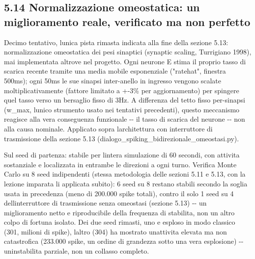 \documentclass[
  italian,
]{article}
\begin{document}
\subsection{5.14 Normalizzazione omeostatica: un miglioramento reale, verificato ma non perfetto}\label{normalizzazione-omeostatica-un-miglioramento-reale-verificato-ma-non-perfetto}

Decimo tentativo, l\textquotesingle unica pista rimasta indicata alla fine della sezione 5.13: normalizzazione omeostatica dei pesi sinaptici (synaptic scaling, Turrigiano 1998), mai implementata altrove nel progetto. Ogni neurone E stima il proprio tasso di scarica recente tramite una media mobile esponenziale ("ratehat", finestra 500ms); ogni 50ms le sue sinapsi inter-anello in ingresso vengono scalate moltiplicativamente (fattore limitato a +-3\% per aggiornamento) per spingere quel tasso verso un bersaglio fisso di 3Hz. A differenza del tetto fisso per-sinapsi (w\_\allowbreak{}max, l\textquotesingle unico strumento usato nei tentativi precedenti), questo meccanismo reagisce alla vera conseguenza funzionale -\/- il tasso di scarica del neurone -\/- non alla causa nominale. Applicato sopra l\textquotesingle architettura con interruttore di trasmissione della sezione 5.13 (dialogo\_\allowbreak{}spiking\_\allowbreak{}bidirezionale\_\allowbreak{}omeostasi.py).

Sul seed di partenza: stabile per l\textquotesingle intera simulazione di 60 secondi, con attivita\textquotesingle{} sostanziale e localizzata in entrambe le direzioni a ogni turno. Verifica Monte Carlo su 8 seed indipendenti (stessa metodologia delle sezioni 5.11 e 5.13, con la lezione imparata li\textquotesingle{} applicata subito): 6 seed su 8 restano stabili secondo la soglia usata in precedenza (meno di 200.000 spike totali), contro il solo 1 seed su 4 dell\textquotesingle interruttore di trasmissione senza omeostasi (sezione 5.13) -\/- un miglioramento netto e riproducibile della frequenza di stabilita\textquotesingle, non un altro colpo di fortuna isolato. Dei due seed rimasti, uno e\textquotesingle{} esploso in modo classico (301, milioni di spike), l\textquotesingle altro (304) ha mostrato un\textquotesingle attivita\textquotesingle{} elevata ma non catastrofica (233.000 spike, un ordine di grandezza sotto una vera esplosione) -\/- un\textquotesingle instabilita\textquotesingle{} parziale, non un collasso completo.
\end{document}
